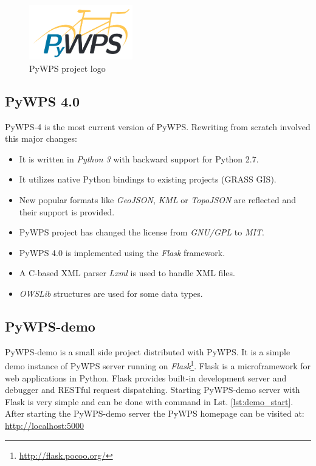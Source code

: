 \documentclass[12pt,a4paper]{article}
\begin{document}
\begin{figure}[h!]
\centering
\includegraphics[width=0.4\textwidth]{img/pywps_logo.png}
\caption{PyWPS project logo}
\label{fig:pywps_logo}
\end{figure}

\subsection{PyWPS 4.0}
\label{sec:PyWPS4}
PyWPS-4 is the most current version of PyWPS. Rewriting from scratch involved this major changes:
\begin{itemize}
\item It is written in \textit{Python 3} with backward support for Python 2.7.
\item It utilizes native Python bindings to existing projects (GRASS GIS).
\item New popular formats like \textit{GeoJSON}, \textit{KML} or \textit{TopoJSON} are reflected and their support is provided.
\item PyWPS project has changed the license from \textit{GNU/GPL} to \textit{MIT}.
\item PyWPS 4.0 is implemented using the \textit{Flask} framework.
\item A C-based XML parser \textit{Lxml} is used to handle XML files.
\item \textit{OWSLib} structures are used for some data types.
\end{itemize}

\subsection{PyWPS-demo}
PyWPS-demo is a small side project distributed with PyWPS. It is a simple demo instance of PyWPS server running on 
\textit{Flask}\footnote{\url{http://flask.pocoo.org/}}. Flask is a microframework for web applications in Python. 
Flask provides built-in development server and debugger and RESTful request dispatching. Starting PyWPS-demo server with Flask
is very simple and can be done with command in Lst. \ref{lst:demo_start}. After starting the PyWPS-demo server the PyWPS homepage can be 
visited at: \url{http://localhost:5000}
\end{document}
